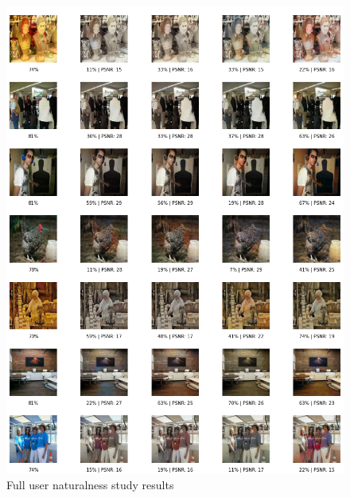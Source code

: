 \begin{figure}[H]
    \centering
    \includegraphics[width=1\columnwidth]{sections/appendix/study_result_part2.png}
    \caption{Full user naturalness study results}
    \label{fig:my_label}
\end{figure}

